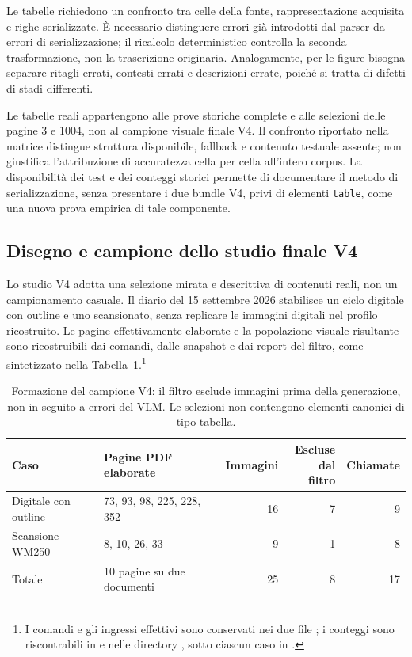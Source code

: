 Le tabelle richiedono un confronto tra celle della fonte, rappresentazione acquisita e righe serializzate. È necessario distinguere errori già introdotti dal parser da errori di serializzazione; il ricalcolo deterministico controlla la seconda trasformazione, non la trascrizione originaria. Analogamente, per le figure bisogna separare ritagli errati, contesti errati e descrizioni errate, poiché si tratta di difetti di stadi differenti.

Le tabelle reali appartengono alle prove storiche complete e alle selezioni delle pagine 3 e 1004, non al campione visuale finale V4. Il confronto riportato nella matrice distingue struttura disponibile, fallback e contenuto testuale assente; non giustifica l'attribuzione di accuratezza cella per cella all'intero corpus. La disponibilità dei test e dei conteggi storici permette di documentare il metodo di serializzazione, senza presentare i due bundle V4, privi di elementi \texttt{table}, come una nuova prova empirica di tale componente.

\subsection{Disegno e campione dello studio finale V4}

Lo studio V4 adotta una selezione mirata e descrittiva di contenuti reali, non un campionamento casuale. Il diario del 15 settembre 2026 stabilisce un ciclo digitale con outline e uno scansionato, senza replicare le immagini digitali nel profilo ricostruito. Le pagine effettivamente elaborate e la popolazione visuale risultante sono ricostruibili dai comandi, dalle snapshot e dai report del filtro, come sintetizzato nella Tabella~\ref{tab:campione-v4}.\footnote{I comandi e gli ingressi effettivi sono conservati nei due file ; i conteggi sono riscontrabili in  e nelle directory , sotto ciascun caso in .}

\begin{table}[!htbp]
\centering
\caption{Formazione del campione V4: il filtro esclude immagini prima della generazione, non in seguito a errori del VLM. Le selezioni non contengono elementi canonici di tipo tabella.}
\label{tab:campione-v4}
\small
\begin{tabularx}{\textwidth}{@{}>{\raggedright\arraybackslash}p{}Xrrr@{}}
\toprule
Caso & Pagine PDF elaborate & Immagini & \shortstack{Escluse\\dal filtro} & Chiamate \tabularnewline
\midrule
Digitale con outline & 73, 93, 98, 225, 228, 352 & 16 & 7 & 9 \\
Scansione WM250 & 8, 10, 26, 33 & 9 & 1 & 8 \\
\midrule
Totale & 10 pagine su due documenti & 25 & 8 & 17 \\
\bottomrule
\end{tabularx}
\end{table}

